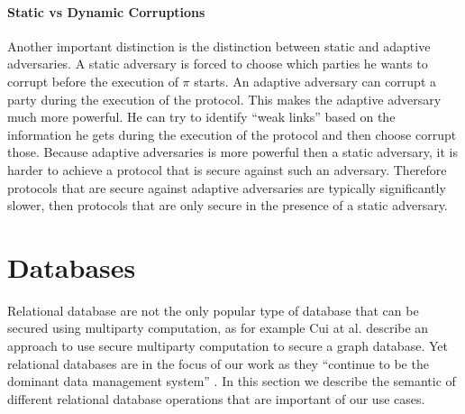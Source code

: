 \paragraph{Static vs Dynamic Corruptions}
Another important distinction is the distinction between static and adaptive adversaries. A static adversary is forced to choose which parties he wants to corrupt before the execution of $ \pi $ starts. An adaptive adversary can corrupt a party during the execution of the protocol. This makes the adaptive adversary much more powerful. He can try to identify ``weak links'' based on the information he gets during the execution of the protocol and then choose corrupt those. Because adaptive adversaries is more powerful then a static adversary, it is harder to achieve a protocol that is secure against such an adversary. Therefore protocols that are secure against adaptive adversaries are typically significantly slower, then protocols that are only secure in the presence of a static adversary.


\section{Databases}
\label{Databases}
Relational database are not the only popular type of database that can be secured using multiparty computation, as for example Cui at al. \cite{cui2020secure} describe an approach to use secure multiparty computation to secure a graph database. Yet relational databases are in the focus of our work as they ``continue to be the dominant data management system'' \cite{Archer2018FromKT}.  In this section we describe the semantic of different relational database operations that are important of our use cases. %


